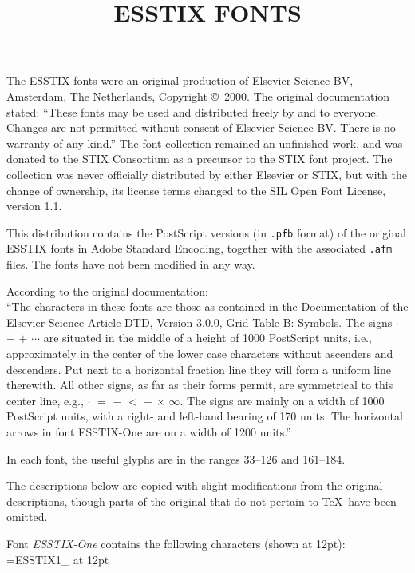 \documentclass[11pt]{amsart}
\title{ESSTIX FONTS}
\author{}
\begin{document}
\maketitle
The ESSTIX fonts were an original production of Elsevier Science BV, Amsterdam, The Netherlands, Copyright \copyright\ 2000. The original documentation stated: ``These fonts may be used and distributed freely by and to everyone. Changes are not permitted without consent of Elsevier Science BV. There is no warranty of any kind.'' The font collection remained an unfinished work, and was donated to the STIX Consortium as a precursor to the STIX font project. The collection was never officially distributed by either Elsevier or STIX, but with the change of ownership, its license terms changed to the SIL Open Font License, version 1.1.

This distribution contains the PostScript versions (in {\tt.pfb} format) of the original ESSTIX fonts in Adobe Standard Encoding, together with the associated {\tt.afm} files. The fonts have not been modified in any way.

According to the original documentation:\\
``The characters in these fonts are those as contained in the Documentation of the Elsevier Science Article DTD, Version 3.0.0, Grid Table B: Symbols. The signs $\cdot$ $ -$ $+$ $ \cdots$  are situated in the middle of a height of 1000 PostScript units, i.e., approximately in the center of the lower case characters without ascenders and descenders. Put next to a horizontal fraction line they will form a uniform line therewith. All other signs, as far as their forms permit, are symmetrical to this center line, e.g., $\cdot$ $=$ $ -$ $<$ $+$ $\times$ $\infty$. The signs are mainly on a width of 1000 PostScript units, with a right- and left-hand bearing of 170 units. The horizontal arrows in font ESSTIX-One are on a width of 1200 units.''

In each font, the useful glyphs are in the ranges 33--126 and 161--184.

The descriptions below are copied with slight modifications from the original descriptions, though parts of the original that do not pertain to \TeX\ have been omitted.

Font  \emph{ESSTIX-One} contains the following characters (shown at 12pt):\\[3pt]
\font\ess=ESSTIX1_ at 12pt
{\ess{}}\newline
{\ess{}}\newline
{\ess{}}{\ess{}}
\end{document}
